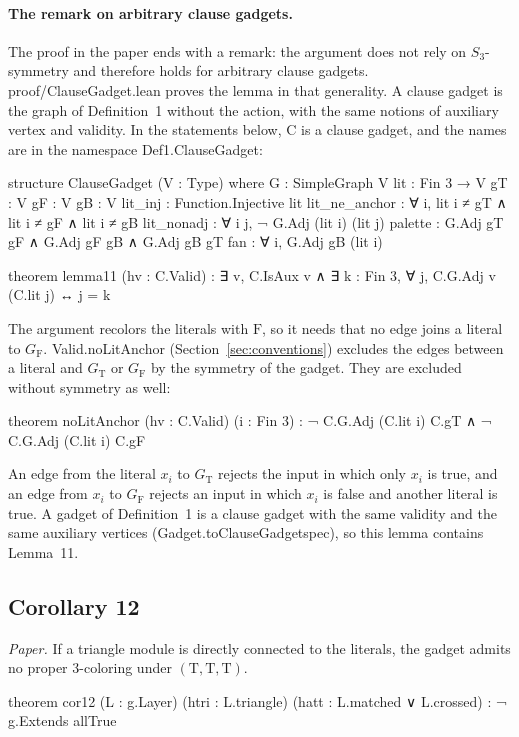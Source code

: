 \documentclass[11pt,a4paper]{article}
\newcommand{\leanus}{\textunderscore\allowbreak}
\newcommand{\lean}[1]{{\ttfamily\let\_\leanus #1}}
\newcommand{\GT}{G_{\mathrm{T}}}
\newcommand{\GF}{G_{\mathrm{F}}}
\newcommand{\T}{\mathrm{T}}
\newcommand{\F}{\mathrm{F}}
\begin{document}
\paragraph{The remark on arbitrary clause gadgets.}\label{sec:arbitrary}
The proof in the paper ends with a remark: the argument does not rely on
$S_3$-symmetry and therefore holds for arbitrary clause gadgets.
\lean{proof/ClauseGadget.lean} proves the lemma in that generality. A
clause gadget is the graph of Definition~1 without the action, with the same
notions of auxiliary vertex and validity. In the statements below,
\lean{C} is a clause gadget, and the names are in the namespace
\lean{Def1.ClauseGadget}:
\begin{code}
structure ClauseGadget (V : Type) where
  G : SimpleGraph V
  lit : Fin 3 → V
  gT : V
  gF : V
  gB : V
  lit_inj : Function.Injective lit
  lit_ne_anchor : ∀ i, lit i ≠ gT ∧ lit i ≠ gF ∧ lit i ≠ gB
  lit_nonadj : ∀ i j, ¬ G.Adj (lit i) (lit j)
  palette : G.Adj gT gF ∧ G.Adj gF gB ∧ G.Adj gB gT
  fan : ∀ i, G.Adj gB (lit i)

theorem lemma11 (hv : C.Valid) :
    ∃ v, C.IsAux v ∧ ∃ k : Fin 3, ∀ j, C.G.Adj v (C.lit j) ↔ j = k
\end{code}
The argument recolors the literals with $\F$, so it needs that no edge
joins a literal to $\GF$. \lean{Valid.noLitAnchor}
(Section~\ref{sec:conventions}) excludes the edges between a literal and
$\GT$ or $\GF$ by the symmetry of the gadget. They are excluded without
symmetry as well:
\begin{code}
theorem noLitAnchor (hv : C.Valid) (i : Fin 3) :
    ¬ C.G.Adj (C.lit i) C.gT ∧ ¬ C.G.Adj (C.lit i) C.gF
\end{code}
An edge from the literal $x_i$ to $\GT$ rejects the input in which only
$x_i$ is true, and an edge from $x_i$ to $\GF$ rejects an input in which
$x_i$ is false and another literal is true. A gadget of Definition~1 is a
clause gadget with the same validity and the same auxiliary vertices
(\lean{Gadget.toClauseGadget\_spec}), so this lemma contains Lemma~11.

\subsection{Corollary 12}
\emph{Paper.} If a triangle module is directly connected to the literals,
the gadget admits no proper 3-coloring under $(\T,\T,\T)$.
\begin{code}
theorem cor12 (L : g.Layer) (htri : L.triangle) (hatt : L.matched ∨ L.crossed) :
    ¬ g.Extends allTrue
\end{code}
\end{document}
